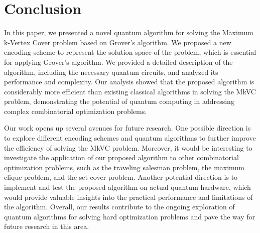 \section{Conclusion}
\label{sec:conclusion}

In this paper, we presented a novel quantum algorithm for solving the Maximum k-Vertex Cover problem based on Grover's algorithm. We proposed a new encoding scheme to represent the solution space of the problem, which is essential for applying Grover's algorithm. We provided a detailed description of the algorithm, including the necessary quantum circuits, and analyzed its performance and complexity. Our analysis showed that the proposed algorithm is considerably more efficient than existing classical algorithms in solving the MkVC problem, demonstrating the potential of quantum computing in addressing complex combinatorial optimization problems.

Our work opens up several avenues for future research. One possible direction is to explore different encoding schemes and quantum algorithms to further improve the efficiency of solving the MkVC problem. Moreover, it would be interesting to investigate the application of our proposed algorithm to other combinatorial optimization problems, such as the traveling salesman problem, the maximum clique problem, and the set cover problem. Another potential direction is to implement and test the proposed algorithm on actual quantum hardware, which would provide valuable insights into the practical performance and limitations of the algorithm. Overall, our results contribute to the ongoing exploration of quantum algorithms for solving hard optimization problems and pave the way for future research in this area.

